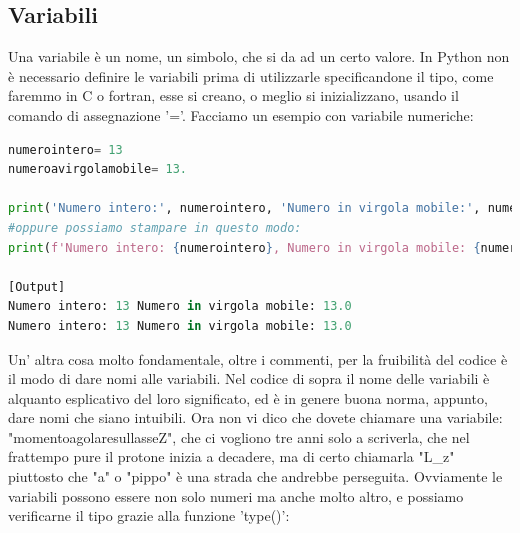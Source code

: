 \documentclass[10pt,a4paper]{article}
\begin{document}
\subsection{Variabili}
Una variabile è un nome, un simbolo, che si da ad un certo valore. In Python non è necessario definire le variabili prima di utilizzarle specificandone il tipo, come faremmo in C o fortran, esse si creano, o meglio si inizializzano, usando il comando di assegnazione '='. Facciamo un esempio con variabile numeriche:

\begin{lstlisting}[language=Python]
numerointero= 13
numeroavirgolamobile= 13.

print('Numero intero:', numerointero, 'Numero in virgola mobile:', numeroavirgolamobile)
#oppure possiamo stampare in questo modo:
print(f'Numero intero: {numerointero}, Numero in virgola mobile: {numeroavirgolamobile}')

[Output]
Numero intero: 13 Numero in virgola mobile: 13.0
Numero intero: 13 Numero in virgola mobile: 13.0
\end{lstlisting}
Un' altra cosa molto fondamentale, oltre i commenti, per la fruibilità del codice è il modo di dare nomi alle variabili.
Nel codice di sopra il nome delle variabili è alquanto esplicativo del loro significato, ed è in genere buona norma, appunto, dare nomi che siano intuibili. Ora non vi dico che dovete chiamare una variabile: "momentoagolaresullasseZ", che ci vogliono tre anni solo a scriverla, che nel frattempo pure il protone inizia a decadere, ma di certo chiamarla "L\_z" piuttosto che "a" o "pippo" è una strada che andrebbe perseguita. 
Ovviamente le variabili possono essere non solo numeri ma anche molto altro, e possiamo verificarne il tipo grazie alla funzione 'type()':
\end{document}
